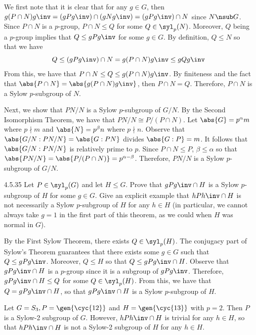 \begin{sol}
	We first note that it is clear that for any $g \in G$, then $g(P \cap N)g\inv = (gPg\inv) \cap (gNg\inv) = (gPg\inv) \cap N$ since $N \nsub G$.
	Since $P \cap N$ is a $p$-group, $P \cap N \leq Q$ for some $Q \in \syl_p(N)$.
	Moreover, $Q$ being a $p$-group implies that $Q \leq gPg\inv$ for some $g \in G$.
	By definition, $Q \leq N$ so that we have
	\[
		Q \leq (gPg\inv) \cap N = g(P \cap N)g\inv \leq gQg\inv
	\]
	From this, we have that $P \cap N \leq Q \leq g(P \cap N)g\inv$.
	By finiteness and the fact that $\abs{P \cap N} = \abs{g(P \cap N)g\inv}$, then $P \cap N = Q$.
	Therefore, $P \cap N$ is a Sylow $p$-subgroup of $N$.

	Next, we show that $PN/N$ is a Sylow $p$-subgroup of $G/N$.
	By the Second Isomorphism Theorem, we have that $PN/N \cong P/(P \cap N)$.
	Let $\abs{G} = p^\alpha m$ where $p \nmid m$ and $\abs{N} = p^\beta n$ where $p \nmid n$.
	Observe that $\abs{G/N : PN/N} = \abs{G: PN}$ divides $\abs{G : P} = m$.
	It follows that $\abs{G/N : PN/N}$ is relatively prime to $p$.
	Since $P \cap N \leq P$, $\beta \leq \alpha$ so that $\abs{PN/N} = \abs{P/(P \cap N)} = p^{\alpha - \beta}$.
	Therefore, $PN/N$ is a Sylow $p$-subgroup of $G/N$.
\end{sol}

\begin{exercise}{4.5.35}
	Let $P \in \syl_p(G)$ and let $H \leq G$.
	Prove that $gPg\inv \cap H$ is a Sylow $p$-subgroup of $H$ for some $g \in G$.
	Give an explicit example that $hPh\inv \cap H$ is not necessarily a Sylow $p$-subgroup of $H$ for any $h \in H$ (in particular, we cannot always take $g = 1$ in the first part of this theorem, as we could when $H$ was normal in $G$).
\end{exercise}

\begin{sol}
	By the First Sylow Theorem, there exists $Q \in \syl_p(H)$.
	The conjugacy part of Sylow's Theorem guarantees that there exists some $g \in G$ such that $Q \leq gPg\inv$.
	Moreover, $Q \leq H$ so that $Q \leq gPg\inv \cap H$.
	Observe that $gPg\inv \cap H$ is a $p$-group since it is a subgroup of $gPg\inv$.
	Therefore, $gPg\inv \cap H \leq Q$ for some $Q \in \syl_p(H)$.
	From this, we have that $Q = gPg\inv \cap H$, so that $gPg\inv \cap H$ is a Sylow $p$-subgroup of $H$.

	Let $G = S_3, P = \gen{\cyc{1 2}}$ and $H = \gen{\cyc{1 3}}$ with $p = 2$.
	Then $P$ is a Sylow-2 subgroup of $G$.
	However, $hPh\inv \cap H$ is trivial for any $h \in H$, so that $hPh\inv \cap H$ is not a Sylow-2 subgroup of $H$ for any $h \in H$.
\end{sol}

